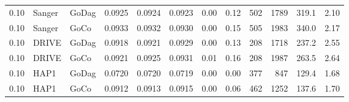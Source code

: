 \begin{table}[htbp]
{\begin{tabular}{l l l rrr rr rrrr}
0.10 & Sanger & GoDag & 0.0925 & 0.0924 & 0.0923 & 0.00 & 0.12 & 502 & 1789 & 319.1 & 2.10 \\
0.10 & Sanger & GoCo & 0.0933 & 0.0932 & 0.0930 & 0.00 & 0.15 & 505 & 1983 & 340.0 & 2.17 \\
0.10 & DRIVE & GoDag & 0.0918 & 0.0921 & 0.0929 & 0.00 & 0.13 & 208 & 1718 & 237.2 & 2.55 \\
0.10 & DRIVE & GoCo & 0.0921 & 0.0925 & 0.0931 & 0.01 & 0.16 & 208 & 1987 & 263.5 & 2.64 \\
0.10 & HAP1 & GoDag & 0.0720 & 0.0720 & 0.0719 & 0.00 & 0.00 & 377 & 847 & 129.4 & 1.68 \\
0.10 & HAP1 & GoCo & 0.0912 & 0.0913 & 0.0915 & 0.00 & 0.06 & 462 & 1252 & 137.6 & 1.70 \\
\bottomrule
\end{tabular}}
\end{table}